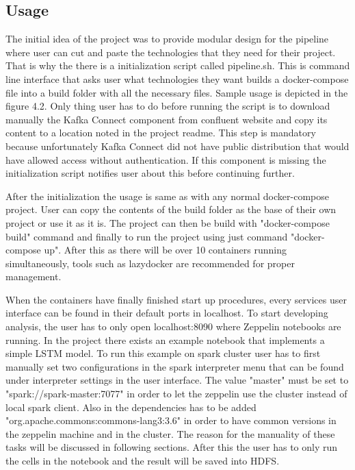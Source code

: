 \subsection{Usage}

The initial idea of the project was to provide modular design for the pipeline where user can cut and paste the technologies that they need for their project.
That is why the there is a initialization script called pipeline.sh.
This is command line interface that asks user what technologies they want builds a docker-compose file into a build folder with all the necessary files.
Sample usage is depicted in the figure 4.2.
Only thing user has to do before running the script is to download manually the Kafka Connect component from confluent website and copy its content to a location noted in the project readme. 
This step is mandatory because unfortunately Kafka Connect did not have public distribution that would have allowed access without authentication.
If this component is missing the initialization script notifies user about this before continuing further.

After the initialization the usage is same as with any normal docker-compose project.
User can copy the contents of the build folder as the base of their own project or use it as it is.
The project can then be build with "docker-compose build" command and finally to run the project using just command "docker-compose up".
After this as there will be over 10 containers running simultaneously, tools such as lazydocker are recommended for proper management.

When the containers have finally finished start up procedures, every services user interface can be found in their default ports in localhost. 
To start developing analysis, the user has to only open localhost:8090 where Zeppelin notebooks are running.
In the project there exists an example notebook that implements a simple LSTM model.
To run this example on spark cluster user has to first manually set two configurations in the spark interpreter menu that can be found under interpreter settings in the user interface.
The value "master" must be set to "spark://spark-master:7077" in order to let the zeppelin use the cluster instead of local spark client.
Also in the dependencies has to be added "org.apache.commons:commons-lang3:3.6" in order to have common versions in the zeppelin machine and in the cluster.
The reason for the manuality of these tasks will be discussed in following sections.
After this the user has to only run the cells in the notebook and the result will be saved into HDFS.

